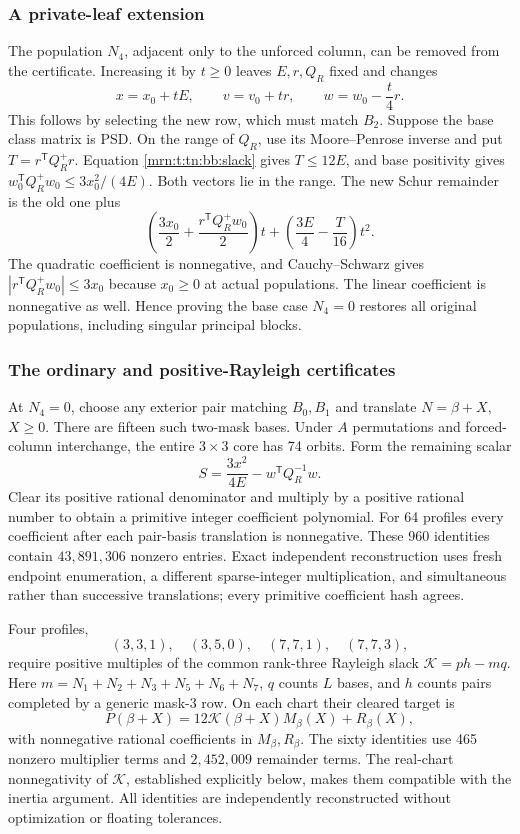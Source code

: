 \documentclass[11pt,a4paper]{article}
\theoremstyle{remark}\newtheorem{remark}[theorem]{Remark}
\begin{document}
\subsubsection{A private-leaf extension}
The population $N_4$, adjacent only to the unforced column, can be removed
from the certificate. Increasing it by $t\ge0$ leaves $E,r,Q_R$ fixed and
changes
\[
 x=x_0+tE,\qquad v=v_0+tr,\qquad w=w_0-\frac t4r .
\]
This follows by selecting the new row, which must match $B_2$.
Suppose the base class matrix is PSD. On the range of $Q_R$, use its
Moore--Penrose inverse and put $T=r^{\mathsf T}Q_R^+r$.
Equation \eqref{mrn:t:tn:bb:slack} gives $T\le12E$, and base positivity gives
$w_0^{\mathsf T}Q_R^+w_0\le3x_0^2/(4E)$.
Both vectors lie in the range. The new Schur remainder is the old one plus
\[
 \left(\frac{3x_0}{2}+\frac{r^{\mathsf T}Q_R^+w_0}{2}\right)t
       +\left(\frac{3E}{4}-\frac{T}{16}\right)t^2.
\]
The quadratic coefficient is nonnegative, and Cauchy--Schwarz gives
$|r^{\mathsf T}Q_R^+w_0|\le3x_0$ because $x_0\ge0$ at actual populations.
The linear coefficient is nonnegative as well.
Hence proving the base case $N_4=0$ restores all original populations,
including singular principal blocks.

\subsubsection{The ordinary and positive-Rayleigh certificates}
At $N_4=0$, choose any exterior pair matching $B_0,B_1$ and translate
$N=\beta+X$, $X\ge0$. There are fifteen such two-mask bases. Under
$A$ permutations and forced-column interchange, the entire $3\times3$
core has 74 orbits. Form the remaining scalar
\[
 S=\frac{3x^2}{4E}-w^{\mathsf T}Q_R^{-1}w.
\]
Clear its positive rational denominator and multiply by a positive rational
number to obtain a primitive integer coefficient polynomial.
For 64 profiles every coefficient after each pair-basis translation is
nonnegative. These 960 identities contain $43{,}891{,}306$ nonzero entries.
Exact independent reconstruction uses fresh endpoint enumeration,
a different sparse-integer multiplication, and simultaneous rather than
successive translations; every primitive coefficient hash agrees.

Four profiles,
\[
 (3,3,1),\quad(3,5,0),\quad(7,7,1),\quad(7,7,3),
\]
require positive multiples of the common rank-three Rayleigh slack
$\mathcal K=ph-mq$. Here $m=N_1+N_2+N_3+N_5+N_6+N_7$,
$q$ counts $L$ bases, and $h$ counts pairs completed by a generic
mask-$3$ row. On each chart their cleared target is
\[
 P(\beta+X)=12\mathcal K(\beta+X)M_\beta(X)+R_\beta(X),
\]
with nonnegative rational coefficients in $M_\beta,R_\beta$.
The sixty identities use 465 nonzero multiplier terms and
$2{,}452{,}009$ remainder terms. The real-chart nonnegativity of
$\mathcal K$, established explicitly below, makes them compatible with
the inertia argument. All identities are independently reconstructed
without optimization or floating tolerances.
\end{document}
